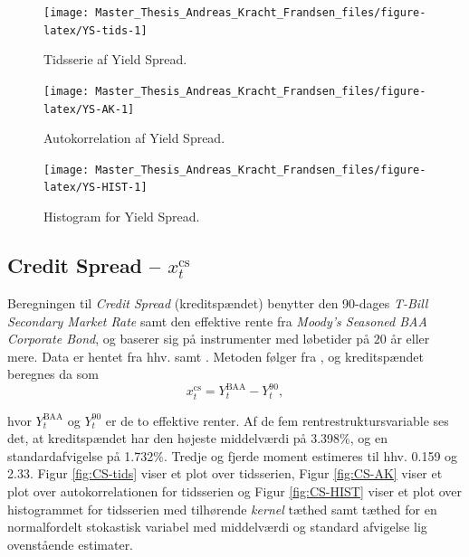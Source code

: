 \documentclass[
  a4paper,
  oneside]{memoir}
\begin{document}
\begin{figure}[H]

{\centering \texttt{[image: Master\_Thesis\_Andreas\_Kracht\_Frandsen\_files/figure-latex/YS-tids-1]} 

}

\caption{Tidsserie af Yield Spread.}\label{fig:YS-tids}
\end{figure}

\begin{figure}[H]

{\centering \texttt{[image: Master\_Thesis\_Andreas\_Kracht\_Frandsen\_files/figure-latex/YS-AK-1]} 

}

\caption{Autokorrelation af Yield Spread.}\label{fig:YS-AK}
\end{figure}

\begin{figure}[H]

{\centering \texttt{[image: Master\_Thesis\_Andreas\_Kracht\_Frandsen\_files/figure-latex/YS-HIST-1]} 

}

\caption{Histogram for Yield Spread.}\label{fig:YS-HIST}
\end{figure}

\hypertarget{credit-spread-x_ttextcs}{%
\subsection{\texorpdfstring{Credit Spread -- \(x_t^{\text{cs}}\)}{Credit Spread -- x\_t\^{}\{\textbackslash text\{cs\}\}}}\label{credit-spread-x_ttextcs}}

Beregningen til \emph{Credit Spread} (kreditspændet) benytter den 90-dages \emph{T-Bill} \emph{Secondary Market Rate} samt den effektive rente fra \emph{Moody's Seasoned BAA Corporate Bond}, og baserer sig på instrumenter med løbetider på \(20\) år eller mere. Data er hentet fra hhv. \citep{FRED902020} samt \citep{Goyal2007}. Metoden følger fra \citep{Keim1986}, og kreditspændet beregnes da som
\[x_t^{\text{cs}}=Y_t^{\text{BAA}}-Y_t^{90},\]

hvor \(Y_t^{\text{BAA}}\) og \(Y_t^{90}\) er de to effektive renter. Af de fem rentrestruktursvariable ses det, at kreditspændet har den højeste middelværdi på 3.398\(\%\), og en standardafvigelse på 1.732\(\%\). Tredje og fjerde moment estimeres til hhv. 0.159 og 2.33. Figur \ref{fig:CS-tids} viser et plot over tidsserien, Figur \ref{fig:CS-AK} viser et plot over autokorrelationen for tidsserien og Figur \ref{fig:CS-HIST} viser et plot over histogrammet for tidsserien med tilhørende \emph{kernel} tæthed samt tæthed for en normalfordelt stokastisk variabel med middelværdi og standard afvigelse lig ovenstående estimater.
\end{document}
